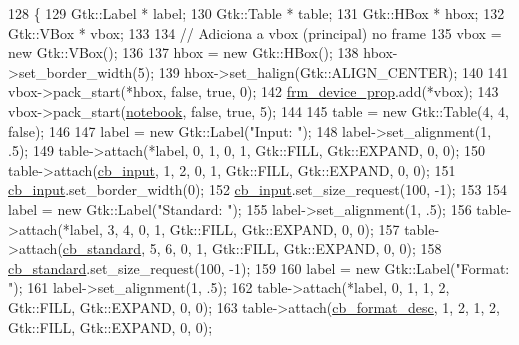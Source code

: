 \begin{DoxyCode}
128                                                       \{
129         Gtk::Label * label;
130         Gtk::Table * table;
131         Gtk::HBox * hbox;
132         Gtk::VBox * vbox;
133 
134         \textcolor{comment}{// Adiciona a vbox (principal) no frame}
135         vbox = \textcolor{keyword}{new} Gtk::VBox();
136 
137         hbox = \textcolor{keyword}{new} Gtk::HBox();
138         hbox->set\_border\_width(5);
139         hbox->set\_halign(Gtk::ALIGN\_CENTER);
140 
141         vbox->pack\_start(*hbox, \textcolor{keyword}{false}, \textcolor{keyword}{true}, 0);
142         \hyperlink{class_v_s_s_s___g_u_i_1_1_v4_l_interface_a5f4e313c287e18402de5918558a3f33e}{frm\_device\_prop}.add(*vbox);
143         vbox->pack\_start(\hyperlink{class_v_s_s_s___g_u_i_1_1_v4_l_interface_a658017c295c18a779272aa6182664da5}{notebook}, \textcolor{keyword}{false}, \textcolor{keyword}{true}, 5);
144 
145         table = \textcolor{keyword}{new} Gtk::Table(4, 4, \textcolor{keyword}{false});
146 
147         label = \textcolor{keyword}{new} Gtk::Label(\textcolor{stringliteral}{"Input: "});
148         label->set\_alignment(1, .5);
149         table->attach(*label, 0, 1, 0, 1, Gtk::FILL, Gtk::EXPAND, 0, 0);
150         table->attach(\hyperlink{class_v_s_s_s___g_u_i_1_1_v4_l_interface_af7c647eefb3e6f7cf8e0fdc170619922}{cb\_input}, 1, 2, 0, 1, Gtk::FILL, Gtk::EXPAND, 0, 0);
151         \hyperlink{class_v_s_s_s___g_u_i_1_1_v4_l_interface_af7c647eefb3e6f7cf8e0fdc170619922}{cb\_input}.set\_border\_width(0);
152         \hyperlink{class_v_s_s_s___g_u_i_1_1_v4_l_interface_af7c647eefb3e6f7cf8e0fdc170619922}{cb\_input}.set\_size\_request(100, -1);
153 
154         label = \textcolor{keyword}{new} Gtk::Label(\textcolor{stringliteral}{"Standard: "});
155         label->set\_alignment(1, .5);
156         table->attach(*label, 3, 4, 0, 1, Gtk::FILL, Gtk::EXPAND, 0, 0);
157         table->attach(\hyperlink{class_v_s_s_s___g_u_i_1_1_v4_l_interface_ae78aa74f420bbb92b59ff0e0f0ac3b1e}{cb\_standard}, 5, 6, 0, 1, Gtk::FILL, Gtk::EXPAND, 0, 0);
158         \hyperlink{class_v_s_s_s___g_u_i_1_1_v4_l_interface_ae78aa74f420bbb92b59ff0e0f0ac3b1e}{cb\_standard}.set\_size\_request(100, -1);
159 
160         label = \textcolor{keyword}{new} Gtk::Label(\textcolor{stringliteral}{"Format: "});
161         label->set\_alignment(1, .5);
162         table->attach(*label, 0, 1, 1, 2, Gtk::FILL, Gtk::EXPAND, 0, 0);
163         table->attach(\hyperlink{class_v_s_s_s___g_u_i_1_1_v4_l_interface_a1f6b2f08ccbc0ecbfba96311ac07aa44}{cb\_format\_desc}, 1, 2, 1, 2, Gtk::FILL, Gtk::EXPAND, 0, 0);

\end{DoxyCode}
